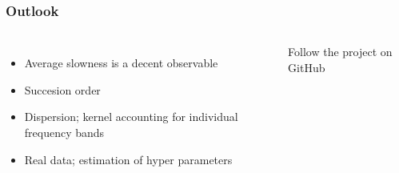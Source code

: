 \documentclass[aspectratio=169, t, 10pt]{beamer}
\begin{document}
\begin{frame}
    \frametitle{Outlook}

\begin{columns}
%
    \begin{itemize}
        \item Average slowness is a decent observable
        \item Succesion order
        \item Dispersion;
            kernel accounting for individual frequency bands
        \item Real data;
            estimation of hyper parameters
    \end{itemize}

    \hspace{15mm} Follow the project on GitHub \\[1cm]
    \hfill {} \hspace{20mm}
\end{columns}

\end{frame}
\end{document}
